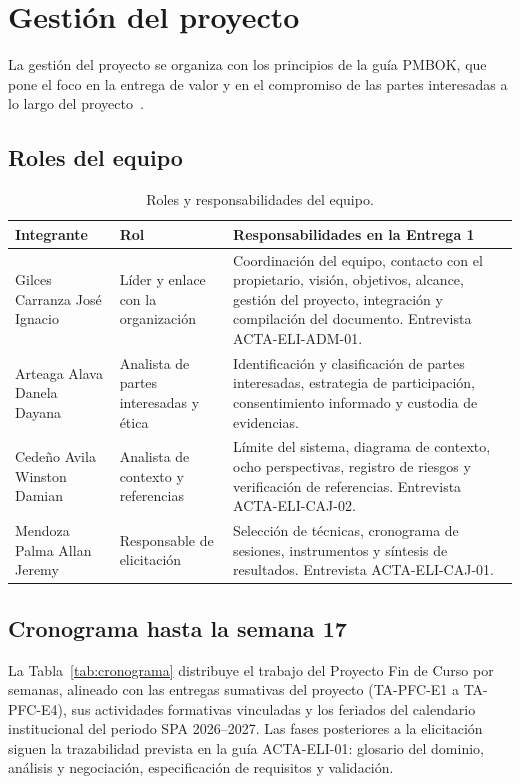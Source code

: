 \section{Gestión del proyecto}\label{sec:gestion}

La gestión del proyecto se organiza con los principios de la guía PMBOK, que pone el foco en la entrega de valor y en el compromiso de las partes interesadas a lo largo del proyecto~\cite{pmbok2021}.

\subsection{Roles del equipo}

\begin{table}[H]
\centering
\caption{Roles y responsabilidades del equipo.}
\label{tab:roles}
\small
\begin{tabularx}{\textwidth}{@{}L{4.3cm}L{3.2cm}X@{}}
\toprule
\textbf{Integrante} & \textbf{Rol} & \textbf{Responsabilidades en la Entrega 1} \\
\midrule
Gilces Carranza José Ignacio & Líder y enlace con la organización & Coordinación del equipo, contacto con el propietario, visión, objetivos, alcance, gestión del proyecto, integración y compilación del documento. Entrevista ACTA-ELI-ADM-01. \\
Arteaga Alava Danela Dayana & Analista de partes interesadas y ética & Identificación y clasificación de partes interesadas, estrategia de participación, consentimiento informado y custodia de evidencias. \\
Cedeño Avila Winston Damian & Analista de contexto y referencias & Límite del sistema, diagrama de contexto, ocho perspectivas, registro de riesgos y verificación de referencias. Entrevista ACTA-ELI-CAJ-02. \\
Mendoza Palma Allan Jeremy & Responsable de elicitación & Selección de técnicas, cronograma de sesiones, instrumentos y síntesis de resultados. Entrevista ACTA-ELI-CAJ-01. \\
\bottomrule
\end{tabularx}
\end{table}

\subsection{Cronograma hasta la semana 17}

La Tabla~\ref{tab:cronograma} distribuye el trabajo del Proyecto Fin de Curso por semanas, alineado con las entregas sumativas del proyecto (TA-PFC-E1 a TA-PFC-E4), sus actividades formativas vinculadas y los feriados del calendario institucional del periodo SPA 2026--2027. Las fases posteriores a la elicitación siguen la trazabilidad prevista en la guía ACTA-ELI-01: glosario del dominio, análisis y negociación, especificación de requisitos y validación.

